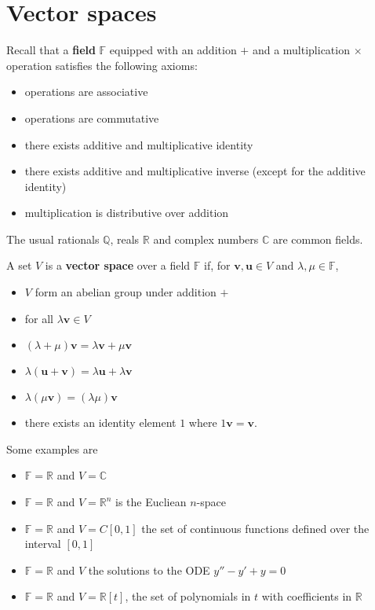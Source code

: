\documentclass[letter-paper]{tufte-book}
\newcommand{\ub}{{\boldsymbol{u}}}
\newcommand{\vb}{{\boldsymbol{v}}}
\begin{document}

\chapter{Vector spaces}

Recall that a \textbf{field} $\mathbb{F}$ equipped with an addition $+$ and a
multiplication $\times$ operation satisfies the following axioms:
\begin{itemize}
  \item operations are associative
  \item operations are commutative
  \item there exists additive and multiplicative identity
  \item there exists additive and multiplicative inverse (except for the
  additive identity)
  \item multiplication is distributive over addition
\end{itemize}

The usual rationals $\mathbb{Q}$, reals $\mathbb{R}$ and complex numbers
$\mathbb{C}$ are common fields.

A set $V$ is a \textbf{vector space} over a field $\mathbb{F}$ if, for $\vb, \ub \in V$ and $\lambda, \mu \in \mathbb{F}$,
\begin{itemize}
  \item $V$ form an abelian group under addition $+$
  \item for all $\lambda\vb \in V$
  \item $(\lambda + \mu)\vb = \lambda \vb + \mu \vb$
  \item $\lambda(\ub + \vb) = \lambda \ub + \lambda \vb$
  \item $\lambda (\mu \vb) = (\lambda \mu) \vb$
  \item there exists an identity element $1$ where $1\vb = \vb$.
\end{itemize}
Some examples are
\begin{itemize}
  \item $\mathbb{F} = \mathbb{R}$ and $V = \mathbb{C}$
  \item $\mathbb{F} = \mathbb{R}$ and $V = \mathbb{R}^n$ is the Eucliean $n$-space
  \item $\mathbb{F} = \mathbb{R}$ and $V = C[0, 1]$ the set of continuous
  functions defined over the interval $[0, 1]$
  \item $\mathbb{F} = \mathbb{R}$ and $V$ the solutions to the ODE $y'' - y' + y
  = 0$
  \item $\mathbb{F} = \mathbb{R}$ and $V = \mathbb{R}[t]$, the set of
  polynomials in $t$ with coefficients in $\mathbb{R}$
\end{itemize}
\end{document}
